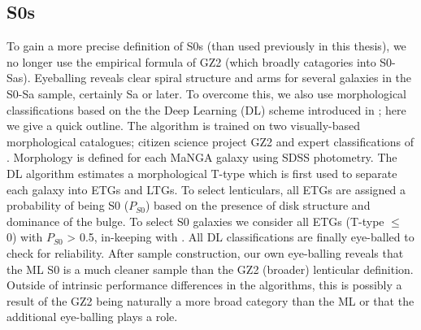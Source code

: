\subsection{S0s}
To gain a more precise definition of S0s (than used previously in this thesis), we no longer use the empirical formula of GZ2 (which broadly catagories into S0-Sas). Eyeballing reveals clear spiral structure and arms for several galaxies in the S0-Sa sample, certainly Sa or later. To overcome this, we also use morphological classifications based on the the Deep Learning (DL) scheme introduced in \citet{Dominguez2018}; here we give a quick outline. The algorithm is trained on two visually-based morphological catalogues; citizen science project GZ2 and expert classifications of \citet{nair2010}. Morphology is defined for each MaNGA galaxy using SDSS photometry. The DL algorithm estimates a morphological T-type \citep[e.g. see;][for more information]{nair2010} which is first used to separate each galaxy into ETGs and LTGs. To select lenticulars, all ETGs are assigned a probability of being S0 ($P_{S0}$) based on the presence of disk structure and dominance of the bulge. To select S0 galaxies we consider all ETGs (T-type $\leq$ 0) with $P_{S0}$ > 0.5, in-keeping with \citet{Dominguez2018}. All DL classifications are finally eye-balled to check for reliability. After sample construction, our own eye-balling reveals that the ML S0 is a much cleaner sample than the GZ2 (broader) lenticular definition. Outside of intrinsic performance differences in the algorithms, this is possibly a result of the GZ2 being naturally a more broad category than the ML or that the additional eye-balling plays a role.

